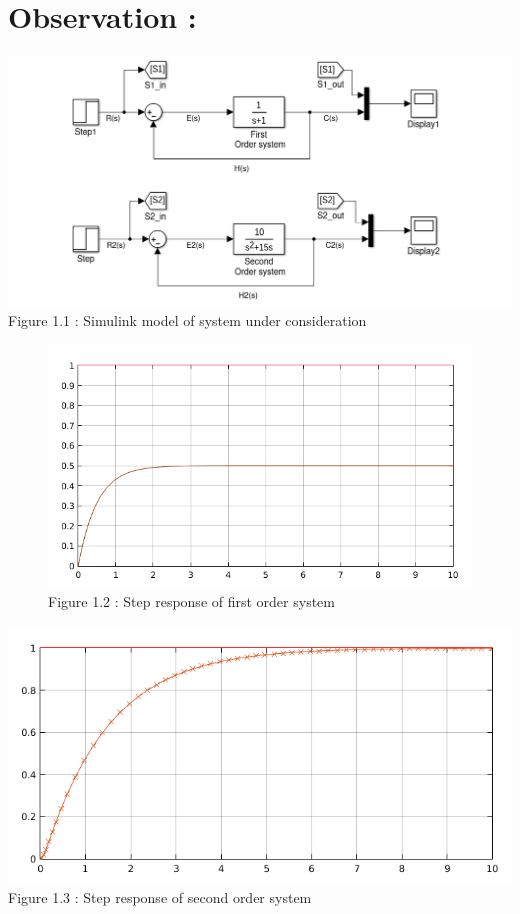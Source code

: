 \message{ !name(lab1.tex)}\documentclass[a4paper,12pt,openany]{book}
\begin{document}
\section{Observation :}
\begin{center}
  \includegraphics[width = 165mm, scale = 0.80]{lab1fig1.png}
  Figure 1.1 : Simulink model of system under consideration
\end{center}
\begin{figure}[h!]
  \begin{center}
  \includegraphics[width = 165mm, scale = 0.80]{graph1.png}
  Figure 1.2 : Step response of first order system
  \end{center}
\end{figure}
\begin{center}
  \includegraphics[width = 165mm, scale = 0.85]{graph2.png}
  Figure 1.3 : Step response of second order system
\end{center}
\end{document}
